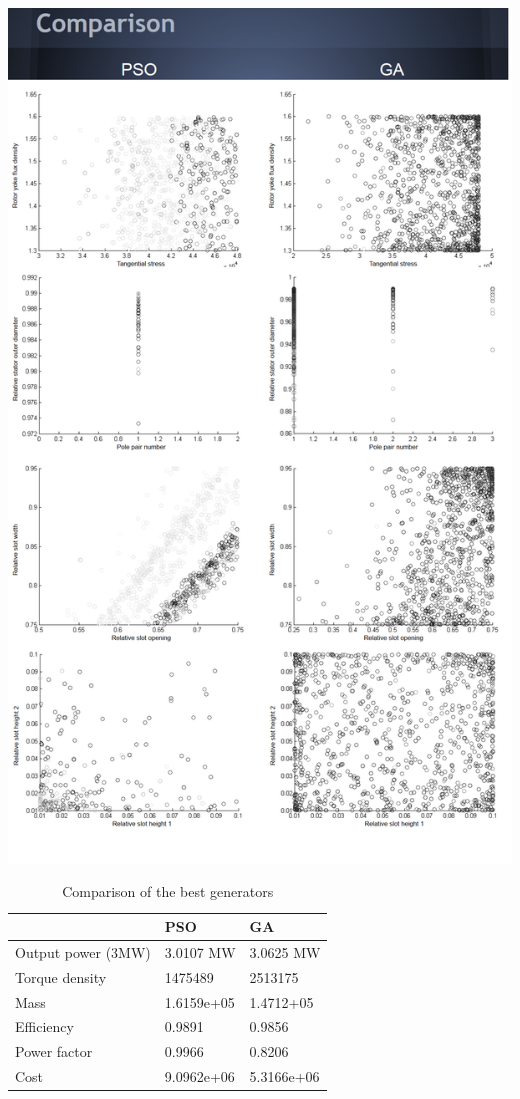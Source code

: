 \documentclass[twoside]{article}
\begin{document}
\newpage
\includegraphics[width=\textwidth,height=\textheight,keepaspectratio]{results2.png}
\newpage
\centering
\begin{table}
\caption{Comparison of the best generators}
\centering
\begin{tabular}{  l  l  l  }

	 & PSO & GA \\ \hline
	Output power (3MW) & 3.0107 MW & 3.0625 MW \\ 
	Torque density & 1475489 & 2513175 \\ 
	Mass & 1.6159e+05 & 1.4712+05 \\ 
	Efficiency & 0.9891 & 0.9856 \\ 
	Power factor & 0.9966 & 0.8206 \\ 
	Cost & 9.0962e+06 & 5.3166e+06 \\ 
\end{tabular}

\end{table}
\clearpage
\end{document}
